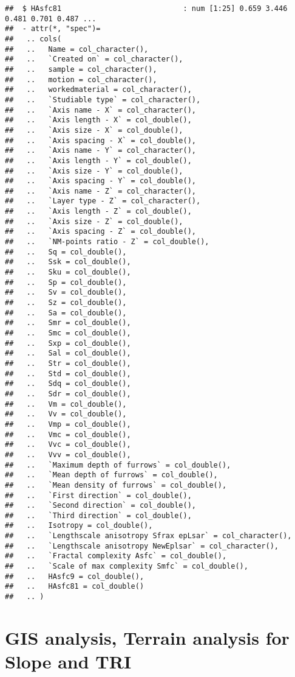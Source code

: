 \documentclass[
]{article}
\begin{document}
\begin{verbatim}
##  $ HAsfc81                            : num [1:25] 0.659 3.446 0.481 0.701 0.487 ...
##  - attr(*, "spec")=
##   .. cols(
##   ..   Name = col_character(),
##   ..   `Created on` = col_character(),
##   ..   sample = col_character(),
##   ..   motion = col_character(),
##   ..   workedmaterial = col_character(),
##   ..   `Studiable type` = col_character(),
##   ..   `Axis name - X` = col_character(),
##   ..   `Axis length - X` = col_double(),
##   ..   `Axis size - X` = col_double(),
##   ..   `Axis spacing - X` = col_double(),
##   ..   `Axis name - Y` = col_character(),
##   ..   `Axis length - Y` = col_double(),
##   ..   `Axis size - Y` = col_double(),
##   ..   `Axis spacing - Y` = col_double(),
##   ..   `Axis name - Z` = col_character(),
##   ..   `Layer type - Z` = col_character(),
##   ..   `Axis length - Z` = col_double(),
##   ..   `Axis size - Z` = col_double(),
##   ..   `Axis spacing - Z` = col_double(),
##   ..   `NM-points ratio - Z` = col_double(),
##   ..   Sq = col_double(),
##   ..   Ssk = col_double(),
##   ..   Sku = col_double(),
##   ..   Sp = col_double(),
##   ..   Sv = col_double(),
##   ..   Sz = col_double(),
##   ..   Sa = col_double(),
##   ..   Smr = col_double(),
##   ..   Smc = col_double(),
##   ..   Sxp = col_double(),
##   ..   Sal = col_double(),
##   ..   Str = col_double(),
##   ..   Std = col_double(),
##   ..   Sdq = col_double(),
##   ..   Sdr = col_double(),
##   ..   Vm = col_double(),
##   ..   Vv = col_double(),
##   ..   Vmp = col_double(),
##   ..   Vmc = col_double(),
##   ..   Vvc = col_double(),
##   ..   Vvv = col_double(),
##   ..   `Maximum depth of furrows` = col_double(),
##   ..   `Mean depth of furrows` = col_double(),
##   ..   `Mean density of furrows` = col_double(),
##   ..   `First direction` = col_double(),
##   ..   `Second direction` = col_double(),
##   ..   `Third direction` = col_double(),
##   ..   Isotropy = col_double(),
##   ..   `Lengthscale anisotropy Sfrax epLsar` = col_character(),
##   ..   `Lengthscale anisotropy NewEplsar` = col_character(),
##   ..   `Fractal complexity Asfc` = col_double(),
##   ..   `Scale of max complexity Smfc` = col_double(),
##   ..   HAsfc9 = col_double(),
##   ..   HAsfc81 = col_double()
##   .. )
\end{verbatim}

\newpage

\hypertarget{gis-analysis-terrain-analysis-for-slope-and-tri}{%
\section{GIS analysis, Terrain analysis for Slope and
TRI}\label{gis-analysis-terrain-analysis-for-slope-and-tri}}
\end{document}
